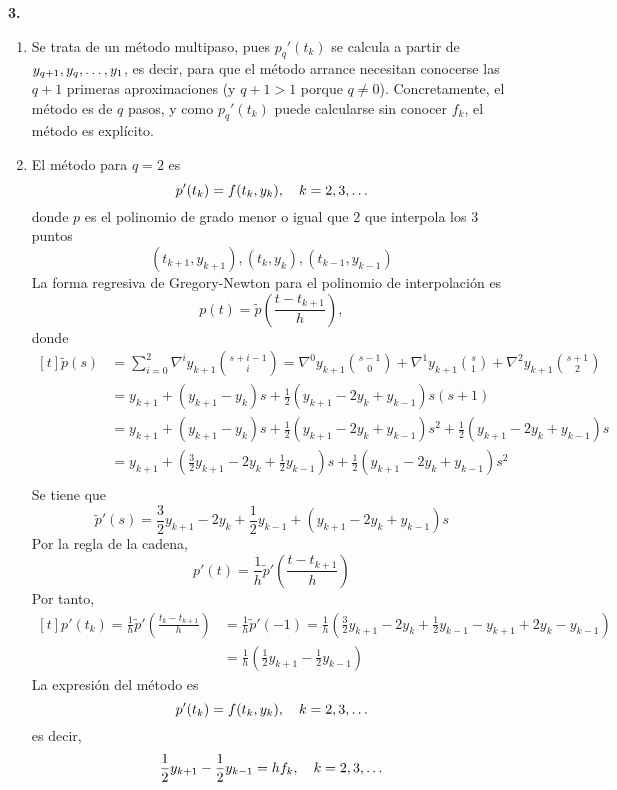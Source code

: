\documentclass[11pt]{report}
\begin{document}
\pagebreak

\textbf{3.}

\begin{enumerate}
    \item Se trata de un método multipaso, pues $p_q'(t_k)$ se calcula a partir de $y_{q+1},y_q,\mathellipsis,y_{1}$, es decir, para que el método arrance necesitan conocerse las $q+1$ primeras aproximaciones (y $q+1 >1$ porque $q \neq 0$). Concretamente, el método es de $q$ pasos, y como $p_q'(t_k)$ puede calcularse sin conocer $f_k$, el método es explícito.
    \item El método para $q = 2$ es
    \[p'(t_k) = f(t_k,y_k), \quad k = 2,3,\mathellipsis\]
    donde $p$ es el polinomio de grado menor o igual que $2$ que interpola los $3$ puntos
    \[(t_{k+1}, y_{k+1}),(t_{k}, y_{k}),(t_{k-1}, y_{k-1})\]
    La forma regresiva de Gregory-Newton para el polinomio de interpolación es
    \[p(t)=\widetilde{p}\left(\frac{t-t_{k+1}}{h}\right),\]
    donde
    \[\begin{aligned}[t]
        \widetilde{p}(s)&=\sum_{i=0}^2 \nabla^iy_{k+1} \binom{s+i-1}{i} = \nabla^0y_{k+1}\binom{s-1}{0}+\nabla^1y_{k+1}\binom{s}{1}+\nabla^2y_{k+1}\binom{s+1}{2} \\
        &= y_{k+1}+(y_{k+1}-y_k)s+\frac{1}{2}(y_{k+1}-2y_k+y_{k-1})s(s+1) \\
        &= y_{k+1}+(y_{k+1}-y_k)s+\frac{1}{2}(y_{k+1}-2y_k+y_{k-1})s^2+\frac{1}{2}(y_{k+1}-2y_k+y_{k-1})s \\
        &= y_{k+1}+\left(\frac{3}{2}y_{k+1}-2y_k+\frac{1}{2}y_{k-1}\right)s+\frac{1}{2}(y_{k+1}-2y_k+y_{k-1})s^2 \\
    \end{aligned}\]
    Se tiene que
    \[\widetilde{p}'(s)=\frac{3}{2}y_{k+1}-2y_k+\frac{1}{2}y_{k-1}+(y_{k+1}-2y_k+y_{k-1})s\]
    Por la regla de la cadena,
    \[p'(t)=\frac{1}{h}\widetilde{p}'\left(\frac{t-t_{k+1}}{h}\right)\]
    Por tanto,
    \[\begin{aligned}[t]
        p'(t_k)=\frac{1}{h}\widetilde{p}'\left(\frac{t_k-t_{k+1}}{h}\right) &= \frac{1}{h}\widetilde{p}'\left(-1\right) = \frac{1}{h}\left(\frac{3}{2}y_{k+1}-2y_k+\frac{1}{2}y_{k-1}-y_{k+1}+2y_k-y_{k-1}\right) \\ &= \frac{1}{h}\left(\frac{1}{2}y_{k+1}-\frac{1}{2}y_{k-1}\right)
     \end{aligned}\]
     La expresión del método es
     \[p'(t_k)=f(t_k,y_k), \quad k = 2,3,\mathellipsis\]
     es decir,
     \[\frac{1}{2}y_{k+1}-\frac{1}{2}y_{k-1} = hf_k, \quad k = 2,3,\mathellipsis\]

\end{enumerate}
\end{document}
